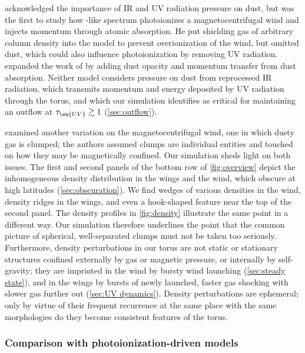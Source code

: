 \documentclass[twocolumn]{article}
\makeatletter
\newcommand*\Citetseealso[3]{%
  \Citeauthor{#1}\nameyeardelim\citetext{%
  \ifx\@empty#2\@empty\citeyear{#1}\else\citeyear{#1,#2}\fi
  \multicitedelim\citealp[see also][]{#3}}}
\makeatother
\begin{document}
 acknowledged the importance of \ac{IR} and \ac{UV}
radiation pressure on dust, but \citet{2005ApJ...631..689E} was the first to
study how -like spectrum photoionizes a magnetocentrifugal wind and
injects momentum through atomic absorption. He put shielding gas of arbitrary
column density into the model to prevent overionization of the wind, but
omitted dust, which could also influence photoionization by removing \ac{UV}
radiation.  expanded the work of
\citet{2005ApJ...631..689E} by adding dust opacity and momentum transfer from
dust absorption. Neither model considers pressure on dust from reprocessed
\ac{IR} radiation, which transmits momentum and energy deposited by \ac{UV}
radiation through the torus, and which our simulation identifies as critical
for maintaining an outflow at $\tau_\su{UV}\gtrsim1$ (\cref{sec:outflow}).

\Citetseealso{2006ApJ...648L.101E}{}{1999ApJ...513..180K} examined another
variation on the magnetocentrifugal wind, one in which dusty gas is clumped;
the authors assumed clumps are individual entities and touched on how they may
be magnetically confined. Our simulation sheds light on both issues. The first
and second panels of the bottom row of \cref{fig:overview} depict the
inhomogeneous density distribution in the wings and the wind, which obscure at
high latitudes (\cref{sec:obscuration}). We find wedges of various densities in
the wind, density ridges in the wings, and even a hook-shaped feature near the
top of the second panel. The density profiles in \cref{fig:density} illustrate
the same point in a different way. Our simulation therefore underlines the
point that the common picture of spherical, well-separated clumps must not be
taken too seriously. Furthermore, density perturbations in our torus are not
static or stationary structures confined externally by gas or magnetic
pressure, or internally by self-gravity; they are imprinted in the wind by
bursty wind launching (\cref{sec:steady state}), and in the wings by bursts of
newly launched, faster gas shocking with slower gas further out (\cref{sec:UV
dynamics}). Density perturbations are ephemeral; only by virtue of their
frequent recurrence at the same place with the same morphologies do they become
consistent features of the torus.

\subsubsection{Comparison with photoionization-driven models}
\end{document}

